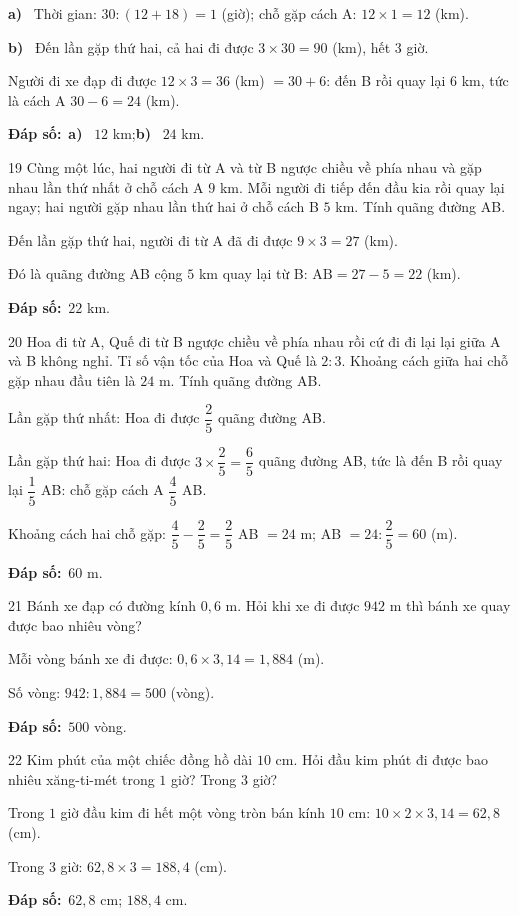 \documentclass[11pt]{article}
\newif\ifsol \solfalse
\providecommand{\AnsWord}{Đáp số}
\newcommand{\dapso}[1]{\par\textbf{\AnsWord:}\ #1}
\newcommand{\probsol}[1]{%
  \begin{lrbox}{\solmeasure}\begin{minipage}{\dimexpr\linewidth-24pt\relax}#1\end{minipage}\end{lrbox}%
  \ifsol
    \begin{solbox}#1\end{solbox}%
  \else
    \setlength{\solht}{\dimexpr\ht\solmeasure+\dp\solmeasure+0.85cm\relax}%
    \ifdim\solht<1.35cm\setlength{\solht}{1.35cm}\fi
    \begin{tcolorbox}[colback=white,colframe=Line,boxrule=0.8pt,arc=5pt,
      left=8pt,right=8pt,top=4pt,bottom=4pt,height=\solht]{\footnotesize\color{Slate}\itshape\WorkWord}\end{tcolorbox}%
  \fi}
\newcommand{\pa}[1]{\textbf{#1)}\ }
\newcommand{\gap}{\vspace{0.3cm}}
\def\WorkWord{Bài làm:}
\def\AnsWord{Đáp số}
\begin{document}
\probsol{
\pa{a} Thời gian: $30:(12+18)=1$ (giờ); chỗ gặp cách A: $12\times1=12$ (km).\par
\pa{b} Đến lần gặp thứ hai, cả hai đi được $3\times30=90$ (km), hết $3$ giờ.\par
Người đi xe đạp đi được $12\times3=36$ (km) $=30+6$: đến B rồi quay lại $6$ km, tức là cách A $30-6=24$ (km).
\dapso{\pa{a} $12$ km;\quad \pa{b} $24$ km.}}
\gap
\begin{probbox}{19}{\relax}
Cùng một lúc, hai người đi từ A và từ B ngược chiều về phía nhau và gặp nhau lần thứ nhất ở chỗ cách A $9$ km. Mỗi người đi tiếp đến đầu kia rồi quay lại ngay; hai người gặp nhau lần thứ hai ở chỗ cách B $5$ km. Tính quãng đường AB.
\end{probbox}
\probsol{
Đến lần gặp thứ hai, người đi từ A đã đi được $9\times3=27$ (km).\par
Đó là quãng đường AB cộng $5$ km quay lại từ B: $\text{AB}=27-5=22$ (km).
\dapso{$22$ km.}}
\gap
\begin{probbox}{20}{\relax}
Hoa đi từ A, Quế đi từ B ngược chiều về phía nhau rồi cứ đi đi lại lại giữa A và B không nghỉ. Tỉ số vận tốc của Hoa và Quế là $2:3$. Khoảng cách giữa hai chỗ gặp nhau đầu tiên là $24$ m. Tính quãng đường AB.
\end{probbox}
\probsol{
Lần gặp thứ nhất: Hoa đi được $\dfrac25$ quãng đường AB.\par
Lần gặp thứ hai: Hoa đi được $3\times\dfrac25=\dfrac65$ quãng đường AB, tức là đến B rồi quay lại $\dfrac15$ AB: chỗ gặp cách A $\dfrac45$ AB.\par
Khoảng cách hai chỗ gặp: $\dfrac45-\dfrac25=\dfrac25$ AB $=24$ m; AB $=24:\dfrac25=60$ (m).
\dapso{$60$ m.}}
\gap
\begin{probbox}{21}{\relax}
Bánh xe đạp có đường kính $0{,}6$ m. Hỏi khi xe đi được $942$ m thì bánh xe quay được bao nhiêu vòng?
\end{probbox}
\probsol{
Mỗi vòng bánh xe đi được: $0{,}6\times3{,}14=1{,}884$ (m).\par Số vòng: $942:1{,}884=500$ (vòng).
\dapso{$500$ vòng.}}
\gap
\begin{probbox}{22}{\relax}
Kim phút của một chiếc đồng hồ dài $10$ cm. Hỏi đầu kim phút đi được bao nhiêu xăng-ti-mét trong $1$ giờ? Trong $3$ giờ?
\end{probbox}
\probsol{
Trong $1$ giờ đầu kim đi hết một vòng tròn bán kính $10$ cm: $10\times2\times3{,}14=62{,}8$ (cm).\par
Trong $3$ giờ: $62{,}8\times3=188{,}4$ (cm).
\dapso{$62{,}8$ cm; $188{,}4$ cm.}}
\end{document}
